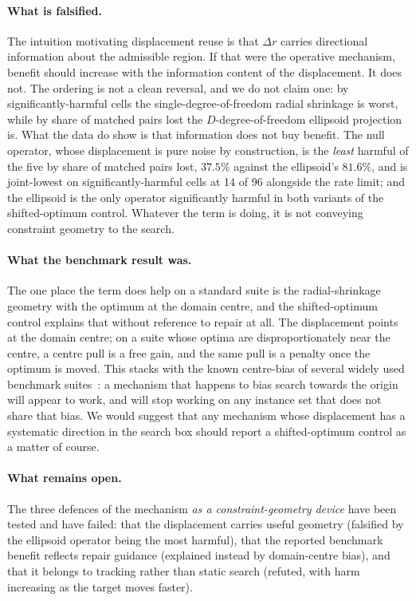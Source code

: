 \documentclass[11pt,a4paper]{article}
\begin{document}
\paragraph{What is falsified.} The intuition motivating displacement reuse is that
$\Delta r$ carries directional information about the admissible region. If that were the
operative mechanism, benefit should increase with the information content of the
displacement. It does not. The ordering is not a clean reversal, and we do not claim one: by
significantly-harmful cells the single-degree-of-freedom radial shrinkage is worst, while
by share of matched pairs lost the $D$-degree-of-freedom ellipsoid projection is. What the
data do show is that information does not buy benefit. The null operator, whose
displacement is pure noise by construction, is the \emph{least} harmful of the five by
share of matched pairs lost, $37.5\%$ against the ellipsoid's $81.6\%$, and is joint-lowest
on significantly-harmful cells at 14 of 96 alongside the rate limit; and the ellipsoid is
the only operator significantly harmful in both variants of the shifted-optimum control. Whatever the term is doing, it is not conveying constraint
geometry to the search.

\paragraph{What the benchmark result was.} The one place the term does help on a standard
suite is the radial-shrinkage geometry with the optimum at the domain centre, and the
shifted-optimum control explains that without reference to repair at all. The displacement points at the domain centre; on a
suite whose optima are disproportionately near the centre, a centre pull is a free gain,
and the same pull is a penalty once the optimum is moved. This stacks with the known
centre-bias of several widely used benchmark suites~\citep{kudela2022}: a mechanism that
happens to bias search towards the origin will appear to work, and will stop working on
any instance set that does not share that bias. We would suggest that any mechanism whose
displacement has a systematic direction in the search box should report a shifted-optimum
control as a matter of course.

\paragraph{What remains open.} The three defences of the mechanism \emph{as a
constraint-geometry device} have been tested and have failed: that the displacement
carries useful geometry (falsified by the ellipsoid operator being the most harmful), that
the reported benchmark benefit reflects repair guidance (explained instead by
domain-centre bias), and that it belongs to tracking rather than static search (refuted,
with harm increasing as the target moves faster).
\end{document}
